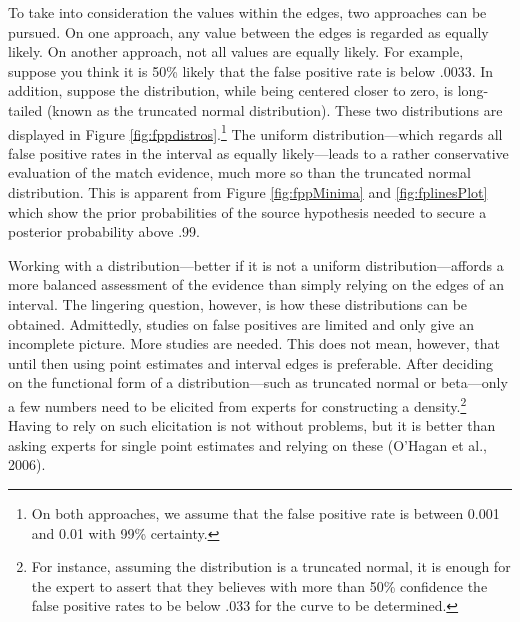 \documentclass[
  10pt,
  dvipsnames,enabledeprecatedfontcommands]{scrartcl}
\begin{document}
To take into consideration the values within the edges, two approaches
can be pursued. On one approach, any value between the edges is regarded
as equally likely. On another approach, not all values are equally
likely. For example, suppose you think it is 50\% likely that the false
positive rate is below .0033. In addition, suppose the distribution,
while being centered closer to zero, is long-tailed (known as the
truncated normal distribution). These two distributions are displayed in
Figure \ref{fig:fppdistros}.\footnote{On both approaches, we assume that
  the false positive rate is between 0.001 and 0.01 with 99\% certainty.}
The uniform distribution---which regards all false positive rates in the
interval as equally likely---leads to a rather conservative evaluation
of the match evidence, much more so than the truncated normal
distribution. This is apparent from Figure \ref{fig:fppMinima} and
\ref{fig:fplinesPlot} which show the prior probabilities of the source
hypothesis needed to secure a posterior probability above .99.

Working with a distribution---better if it is not a uniform
distribution---affords a more balanced assessment of the evidence than
simply relying on the edges of an interval. The lingering question,
however, is how these distributions can be obtained. Admittedly, studies
on false positives are limited and only give an incomplete picture. More
studies are needed. This does not mean, however, that until then using
point estimates and interval edges is preferable. After deciding on the
functional form of a distribution---such as truncated normal or
beta---only a few numbers need to be elicited from experts for
constructing a density.\footnote{For instance, assuming the distribution
  is a truncated normal, it is enough for the expert to assert that they
  believes with more than 50\% confidence the false positive rates to be
  below \(.033\) for the curve to be determined.} Having to rely on such
elicitation is not without problems, but it is better than asking
experts for single point estimates and relying on these (O'Hagan et al.,
2006).
\end{document}
